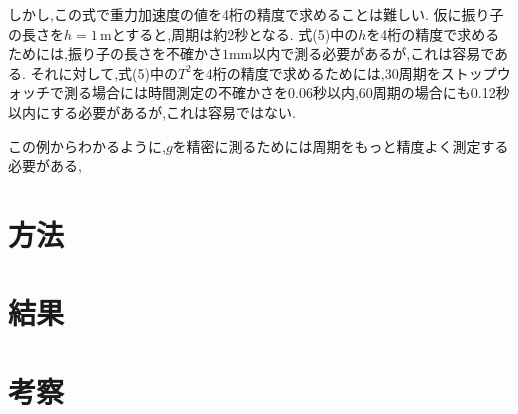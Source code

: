 \documentclass{jarticle}
\begin{document}
しかし,この式で重力加速度の値を4桁の精度で求めることは難しい.
仮に振り子の長さを$h=1\,\mathrm{m}$とすると,周期は約2秒となる.
式(5)中の$h$を4桁の精度で求めるためには,振り子の長さを不確かさ$1\mathrm{mm}$以内で測る必要があるが,これは容易である.
それに対して,式(5)中の$T^2$を4桁の精度で求めるためには,30周期をストップウォッチで測る場合には時間測定の不確かさを0.06秒以内,60周期の場合にも0.12秒以内にする必要があるが,これは容易ではない.

この例からわかるように,$g$を精密に測るためには周期をもっと精度よく測定する必要がある,

\section{方法}

\section{結果}

\section{考察}
\end{document}
